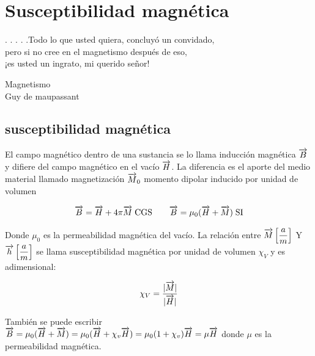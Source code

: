 
\chapter{Susceptibilidad magnética} %



\begin{center}

. . . . .Todo lo que usted quiera, concluyó un convidado, \\
pero si no cree en el magnetismo después de eso, \\
¡es usted un ingrato, mi querido señor!


\hspace{5.6cm} Magnetismo\\
\hspace{4.6cm} Guy
de maupassant  
\end{center}


\vspace{0.5cm} 

\section{susceptibilidad magnética} 
El campo magnético dentro de una sustancia se lo llama inducción magnética $\overrightarrow{B}$ y difiere del campo magnético en el vacío $\overrightarrow{H}$. La diferencia es el aporte del medio material llamado magnetización $\overrightarrow{M}_{0}$ momento dipolar inducido por unidad de volumen

\begin{equation*}
\overrightarrow{B}= \overrightarrow{H} + 4\pi\overrightarrow{M}\; \text{CGS} \qquad  \overrightarrow{B}= \mu_{0}(\overrightarrow{H} +\overrightarrow{M})\; \text{SI}
\end{equation*}

Donde $\mu_{0}$ es la permeabilidad magnética del vacío. La relación entre $\overrightarrow{M} \left[ \dfrac{a}{m} \right]$ Y $\overrightarrow{h} \left[ \dfrac{a}{m} \right]$ se llama susceptibilidad magnética por unidad de volumen $\chi_{V}$ y es adimensional:

\begin{equation*}
\chi_{V} = \dfrac{\vert\overrightarrow{M}\vert}{\vert\overrightarrow{H}\vert}
\end{equation*}

También se puede escribir $\overrightarrow{B}= \mu_{0}(\overrightarrow{H} + \overrightarrow{M}) = \mu_{0}(\overrightarrow{H} + \chi_{v}\overrightarrow{H}) = \mu_{0}(1 + \chi_{v})\overrightarrow{H} = \mu \overrightarrow{H}$ donde $\mu$ es la permeabilidad magnética.

